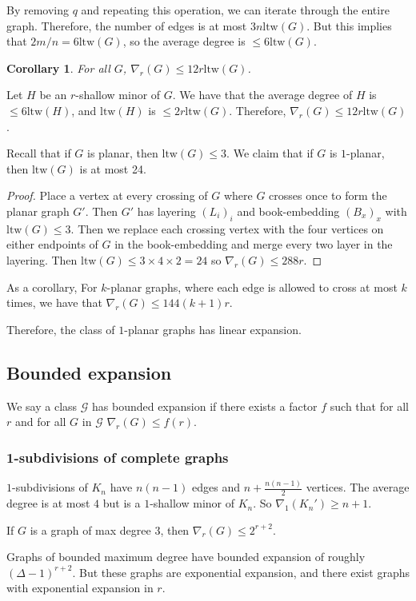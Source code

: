 \documentclass[]{article}
\newcommand{\ltw}{\text{ltw}}
\newtheorem{corollary}[theorem]{Corollary}
\theoremstyle{definition}
\numberwithin{theorem}{section}
\numberwithin{equation}{section}
\begin{document}
By removing $q$ and repeating this operation, we can iterate through the entire graph. Therefore, the number of edges is at most $3n \ltw(G)$. But this implies that $2m/n = 6 \ltw(G)$, so the average degree is $ \leq 6 \ltw(G)$. 

\begin{corollary}
	For all $G$, $\nabla_r(G) \leq 12 r \ltw(G)$.
\end{corollary}
Let $H$ be an $r$-shallow minor of $G$. We have that the average degree of $H$ is $\leq 6 \ltw(H)$, and $\ltw(H)$ is $\leq 2r \ltw(G)$. Therefore, $\nabla_r(G) \leq 12r \ltw(G)$.

Recall that if $G$ is planar, then $\ltw(G) \leq 3$. We claim that if $G$ is $1$-planar, then $\ltw(G)$ is at most 24.

\begin{proof}
	Place a vertex at every crossing of $G$ where $G$ crosses once to form the planar graph $G'$. Then $G'$ has layering $(L_i)_i$ and book-embedding $(B_x)_x$ with $\ltw(G) \leq 3$. Then we replace each crossing vertex with the four vertices on either endpoints of $G$ in the book-embedding and merge every two layer in the layering. Then $\ltw(G) \leq 3 \times 4 \times 2 = 24$ so $\nabla_r(G) \leq 288 r$. 
\end{proof}
As a corollary,
	For $k$-planar graphs, where each edge is allowed to cross at most $k$ times, we have that $\nabla_r(G) \leq 144 (k + 1) r$. 
	
Therefore, the class of $1$-planar graphs has linear expansion.
\subsection{Bounded expansion}
We say a class $\mathcal{G}$ has bounded expansion if there exists a factor $f$ such that for all $r$ and for all $G$ in $\mathcal{G}$ $\nabla_r(G) \leq f(r)$. 
\subsubsection{1-subdivisions of complete graphs}
$1$-subdivisions of $K_n$ have $n(n-1)$ edges and $n + \frac{n(n - 1)}{2}$ vertices. The average degree is at most $4$ but is a $1$-shallow minor of $K_n$. So $\nabla_1(K_n') \geq n + 1$. 

If $G$ is a graph of max degree $3$, then $\nabla_r(G) \leq 2^{r + 2}$. 

Graphs of bounded maximum degree have bounded expansion of roughly $(\Delta - 1)^{r + 2}$. But these graphs are exponential expansion, and there exist graphs with exponential expansion in $r$. 
\end{document}
